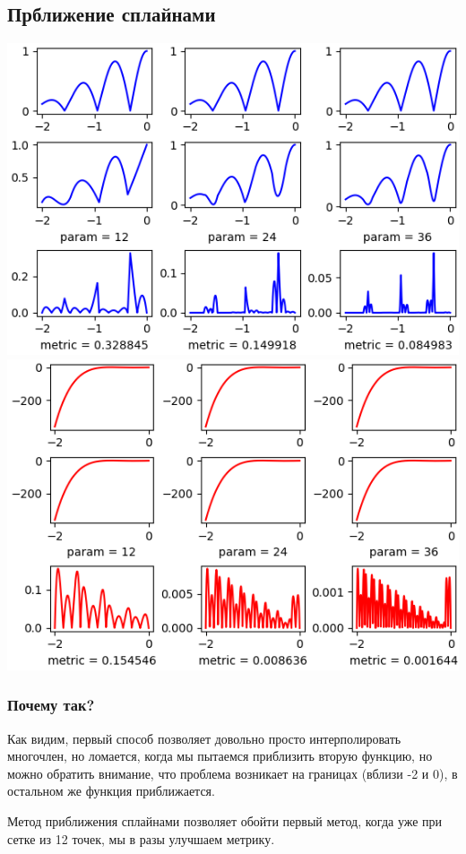 \documentclass{article}
\begin{document}
\subsection{Прближение сплайнами}
\includegraphics{Figure_11.png}
\includegraphics{Figure_10.png}

\subsubsection{Почему так?}
Как видим, первый способ позволяет довольно просто интерполировать многочлен, но ломается, когда мы пытаемся приблизить вторую функцию, но можно обратить внимание, что проблема возникает на границах (вблизи -2 и 0), в остальном же функция приближается.

Метод приближения сплайнами позволяет обойти первый метод, когда уже при сетке из 12 точек, мы в разы улучшаем метрику.
\end{document}
